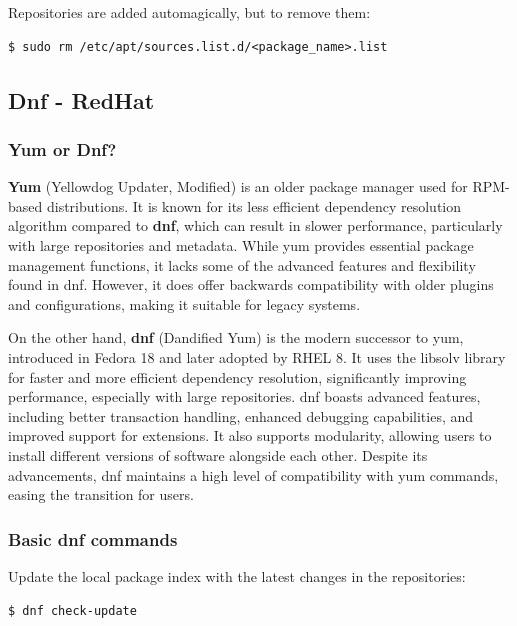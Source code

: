 \documentclass{article}
\newenvironment{codetemplate}[1][]{%
  \mybasecolorbox[#1]
  \itshape
}{%
  \endmybasecolorbox
}
\begin{document}
Repositories are added automagically, but to remove them:
\begin{codetemplate}
\begin{verbatim}
$ sudo rm /etc/apt/sources.list.d/<package_name>.list
\end{verbatim}
\end{codetemplate}

\subsection{Dnf - RedHat}

\subsubsection{Yum or Dnf?}
\textbf{Yum} (Yellowdog Updater, Modified) is an older package manager used for RPM-based distributions. It is known for its less efficient dependency resolution algorithm compared to \textbf{dnf}, which can result in slower performance, particularly with large repositories and metadata. While yum provides essential package management functions, it lacks some of the advanced features and flexibility found in dnf. However, it does offer backwards compatibility with older plugins and configurations, making it suitable for legacy systems.

On the other hand, \textbf{dnf} (Dandified Yum) is the modern successor to yum, introduced in Fedora 18 and later adopted by RHEL 8. It uses the libsolv library for faster and more efficient dependency resolution, significantly improving performance, especially with large repositories. dnf boasts advanced features, including better transaction handling, enhanced debugging capabilities, and improved support for extensions. It also supports modularity, allowing users to install different versions of software alongside each other. Despite its advancements, dnf maintains a high level of compatibility with yum commands, easing the transition for users.

\subsubsection{Basic dnf commands}
Update the local package index with the latest changes in the repositories:
\begin{codetemplate}
\begin{verbatim}
$ dnf check-update
\end{verbatim}
\end{codetemplate}
\end{document}
